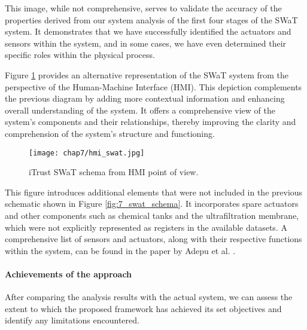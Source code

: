 \bigskip
This image, while not comprehensive, serves to validate the accuracy of the properties derived from our system analysis of the first four stages of the SWaT system. It demonstrates that we have successfully identified the actuators and sensors within the system, and in some cases, we have even determined their specific roles within the physical process.

\bigskip
Figure \ref{fig:7_swat_hmi} \cite{swat_tecnical_pdf} provides an alternative representation of the SWaT system from the perspective of the Human-Machine Interface (HMI). This depiction complements the previous diagram by adding more contextual information and enhancing overall understanding of the system. It offers a comprehensive view of the system's components and their relationships, thereby improving the clarity and comprehension of the system's structure and functioning.

\begin{figure}[ht]
	\centering
	\texttt{[image: chap7/hmi\_swat.jpg]}
	\caption{iTrust SWaT schema from HMI point of view.}
	\label{fig:7_swat_hmi}
\end{figure}

\bigskip
This figure introduces additional elements that were not included in the previous schematic shown in Figure \ref{fig:7_swat_schema}. It incorporates spare actuators and other components such as chemical tanks and the ultrafiltration membrane, which were not explicitly represented as registers in the available datasets. A comprehensive list of sensors and actuators, along with their respective functions within the system, can be found in the paper by Adepu et al. \cite{swat_dataset2015}.


\paragraph{Achievements of the approach}
\label{par:7_achievements}

After comparing the analysis results with the actual system, we can assess the extent to which the proposed framework has achieved its set objectives and identify any limitations encountered.

